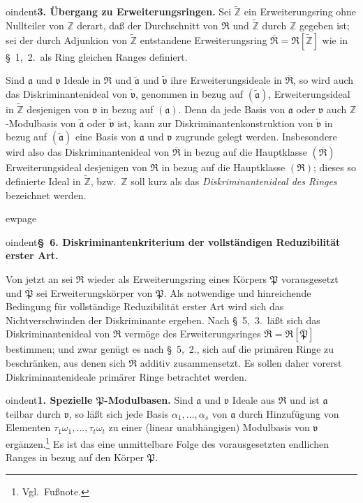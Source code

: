 \documentclass[12pt,a4paper]{article}
\newcommand{\mf}[1]{\mathfrak{#1}}     %
\newcommand{\ideala}{\mathfrak{a}}
\newcommand{\idealv}{\mathfrak{v}}
\newcommand{\PP}{\mathfrak{P}}          %
\newcommand{\ZZ}{\mathbb{Z}}            %
\theoremstyle{definition}
\begin{document}
\medskip



oindent\textbf{3. \"Ubergang zu Erweiterungsringen.} Sei $\tilde{\ZZ}$ ein
Erweiterungsring ohne Nullteiler von $\ZZ$ derart, da\ss{} der Durchschnitt
von $\mf{R}$ und $\tilde{\ZZ}$ durch $\ZZ$ gegeben ist; sei der durch Adjunkion
von $\tilde{\ZZ}$ entstandene Erweiterungsring
$\overline{\mf{R}} = \mf{R}[\tilde{\ZZ}]$ wie in \S~1,~2.\ als Ring gleichen
Ranges definiert.

Sind $\ideala$ und $\idealv$ Ideale in $\mf{R}$ und $\tilde{\ideala}$ und
$\tilde{\idealv}$ ihre Erweiterungsideale in $\overline{\mf{R}}$, so wird auch
das Diskriminantenideal von $\tilde{\idealv}$, genommen in bezug auf
$(\tilde{\ideala})$, Erweiterungsideal in $\tilde{\ZZ}$ desjenigen von
$\idealv$ in bezug auf $(\ideala)$. Denn da jede Basis von $\ideala$ oder
$\idealv$ auch $\ZZ$-Modulbasis von $\tilde{\ideala}$ oder
$\tilde{\idealv}$ ist, kann zur Diskriminantenkonstruktion von
$\tilde{\idealv}$ in bezug auf $(\tilde{\ideala})$ eine Basis von
$\ideala$ und $\idealv$ zugrunde gelegt werden. Insbesondere wird also das
Diskriminantenideal von $\overline{\mf{R}}$ in bezug auf die Hauptklasse
$(\overline{\mf{R}})$ Erweiterungsideal desjenigen von $\mf{R}$ in bezug auf
die Hauptklasse $(\mf{R})$; dieses so definierte Ideal in $\tilde{\ZZ}$,
bzw.\ $\ZZ$ soll kurz als das \textit{Diskriminantenideal des Ringes}
bezeichnet werden.



ewpage
\setcounter{page}{558}



oindent\textbf{\S~6. Diskriminantenkriterium der vollst\"andigen Reduzibilit\"at
erster Art.}

Von jetzt an sei $\mf{R}$ wieder als Erweiterungsring eines K\"orpers $\PP$
vorausgesetzt und $\overline{\PP}$ sei Erweiterungsk\"orper von $\PP$. Als
notwendige und hinreichende Bedingung f\"ur vollst\"andige Reduzibilit\"at
erster Art wird sich das Nichtverschwinden der Diskriminante ergeben. Nach
\S~5,~3.\ l\"a\ss t sich das Diskriminantenideal von $\mf{R}$ verm\"oge des
Erweiterungsringes $\overline{\mf{R}} = \mf{R}[\overline{\PP}]$ bestimmen; und
zwar gen\"ugt es nach \S~5,~2., sich auf die prim\"aren Ringe zu
beschr\"anken, aus denen sich $\overline{\mf{R}}$ additiv zusammensetzt. Es
sollen daher vorerst Diskriminantenideale prim\"arer Ringe betrachtet werden.

\medskip



oindent\textbf{1. Spezielle $\PP$-Modulbasen.} Sind $\ideala$ und
$\idealv$ Ideale aus $\mf{R}$ und ist $\ideala$ teilbar durch $\idealv$, so
l\"a\ss t sich jede Basis $\alpha_1,\dots,\alpha_s$ von $\ideala$ durch
Hinzuf\"ugung von Elementen $\tau_1\omega_1,\dots,\tau_t\omega_t$ zu einer
(linear unabh\"angigen) Modulbasis von $\idealv$ erg\"anzen.\footnote{Vgl.\ Fu\ss note.}
Es ist das eine unmittelbare Folge des vorausgesetzten endlichen Ranges in
bezug auf den K\"orper $\PP$.
\end{document}
